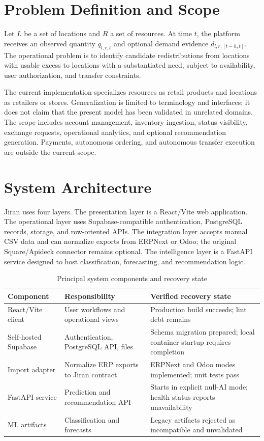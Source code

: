 \documentclass[graybox]{svmult}
\begin{document}
\section{Problem Definition and Scope}
Let $L$ be a set of locations and $R$ a set of resources. At time $t$, the platform receives an observed quantity $q_{l,r,t}$ and optional demand evidence $d_{l,r,[t-h,t]}$. The operational problem is to identify candidate redistributions from locations with usable excess to locations with a substantiated need, subject to availability, user authorization, and transfer constraints.

The current implementation specializes resources as retail products and locations as retailers or stores. Generalization is limited to terminology and interfaces; it does not claim that the present model has been validated in unrelated domains. The scope includes account management, inventory ingestion, status visibility, exchange requests, operational analytics, and optional recommendation generation. Payments, autonomous ordering, and autonomous transfer execution are outside the current scope.

\section{System Architecture}
Jiran uses four layers. The presentation layer is a React/Vite web application. The operational layer uses Supabase-compatible authentication, PostgreSQL records, storage, and row-oriented APIs. The integration layer accepts manual CSV data and can normalize exports from ERPNext or Odoo; the original Square/Apideck connector remains optional. The intelligence layer is a FastAPI service designed to host classification, forecasting, and recommendation logic.

\begin{table}[t]
\caption{Principal system components and recovery state}
\label{tab:components}
\centering
\begin{tabularx}{\textwidth}{p{3.0cm}p{4.0cm}X}
\toprule
Component & Responsibility & Verified recovery state\\
\midrule
React/Vite client & User workflows and operational views & Production build succeeds; lint debt remains\\
Self-hosted Supabase & Authentication, PostgreSQL API, files & Schema migration prepared; local container startup requires completion\\
Import adapter & Normalize ERP exports to Jiran contract & ERPNext and Odoo modes implemented; unit tests pass\\
FastAPI service & Prediction and recommendation API & Starts in explicit null-AI mode; health status reports unavailability\\
ML artifacts & Classification and forecasts & Legacy artifacts rejected as incompatible and unvalidated\\
\bottomrule
\end{tabularx}
\end{table}
\end{document}

